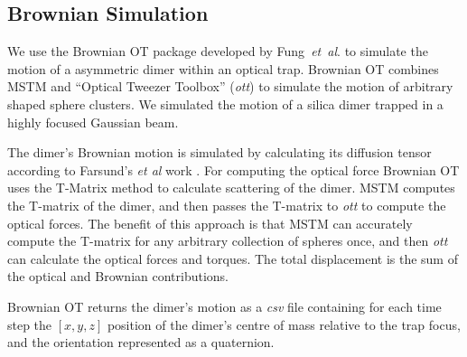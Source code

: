 \documentclass[final,  3p]{elsarticle}
\begin{document}
\subsection{Brownian Simulation}
\label{sec:brownian}

We use the Brownian OT package developed by Fung~\textit{et~al}. \cite{Vigilante2020Brownian_OT} to simulate the motion of a asymmetric dimer within an optical trap. Brownian OT combines MSTM \cite{Mishchenko1996MSTM} and ``Optical Tweezer Toolbox'' (\textit{ott}) \cite{Lenton2020} to simulate the motion of arbitrary
shaped sphere clusters. We simulated the motion of a silica dimer
trapped in a highly focused Gaussian beam.   

The dimer's Brownian motion is simulated by calculating its diffusion tensor according to Farsund's \emph{et al} work \cite{Farsund1996}. For computing the optical force Brownian OT uses the T-Matrix method to calculate scattering of the dimer. MSTM computes the T-matrix of the dimer, and then passes the T-matrix to \textit{ott} to compute the optical forces. The benefit of this approach is that MSTM can accurately compute the T-matrix for any arbitrary collection of spheres once, and then \textit{ott} can calculate the optical forces and torques. The total displacement is the sum of the optical and Brownian contributions.

Brownian OT returns the dimer's motion as a \textit{csv} file containing for each time step the $[x,y,z]$ position of the dimer's centre of mass relative to the trap focus, and the orientation represented as a quaternion.
\end{document}
